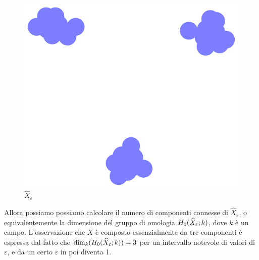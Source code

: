 \begin{figure}[h]
  \begin{center}
    \includegraphics[width=.4\linewidth]{gfx/three_clusters_fat.pdf}
    \caption{$\widehat{X}_\varepsilon$}
    \label{fig:clusters_fat}
  \end{center}
\end{figure}

Allora possiamo possiamo calcolare il numero di componenti connesse di $\widehat{X}_\varepsilon$, o equivalentemente la dimensione del gruppo di omologia $H_{0}(\widehat{X}_\varepsilon;k)$, dove $k$ è un campo. L'osservazione che $X$ è composto essenzialmente da tre componenti è espressa dal fatto che $\mathrm{dim}_k(H_{0}(\widehat{X}_\varepsilon;k))=3$ per un intervallo notevole di valori di $\varepsilon$, e da un certo $\overline{\varepsilon}$ in poi diventa 1.
